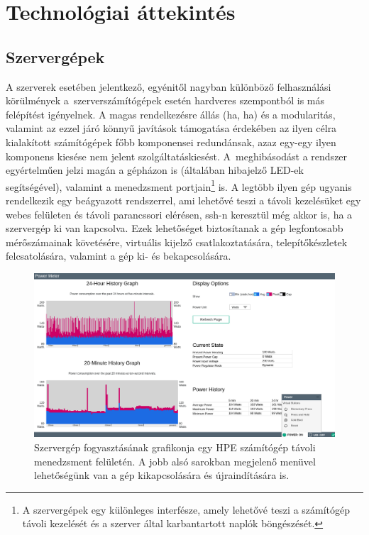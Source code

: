 
\chapter{Technológiai áttekintés}
\label{chap:technologies}

\section{Szervergépek}
\label{sect:servers}
A szerverek esetében jelentkező, egyénitől nagyban különböző felhasználási körülmények a~szerverszámítógépek esetén hardveres szempontból is más felépítést igényelnek. A magas rendelkezésre állás (\acrlong{ha}, \acrshort{ha}) és a modularitás, valamint az ezzel járó könnyű javítások támogatása érdekében az ilyen célra kialakított számítógépek főbb komponensei redundánsak, azaz egy-egy ilyen komponens kiesése nem jelent szolgáltatáskiesést. A~meghibásodást a rendszer egyértelműen jelzi magán a gépházon is (általában hibajelző LED-ek segítségével), valamint a menedzsment portjain\footnote{A szervergépek egy különleges interfésze, amely lehetővé teszi a számítógép távoli kezelését és a szerver által karbantartott naplók böngészését.} is. A legtöbb ilyen gép ugyanis rendelkezik egy beágyazott rendszerrel, ami lehetővé teszi a távoli kezelésüket egy webes felületen és távoli parancssori elérésen, \acrshort{ssh}-n keresztül még akkor is, ha a szervergép ki van kapcsolva. Ezek lehetőséget biztosítanak a gép legfontosabb mérőszámainak követésére, virtuális kijelző csatlakoztatására, telepítőkészletek felcsatolására, valamint a gép ki- és bekapcsolására.

\begin{figure}[!ht]
	\centering
	\includegraphics[width=150mm, keepaspectratio]{figures/ilo-power1.png}
	\caption{Szervergép fogyasztásának grafikonja egy HPE számítógép távoli menedzsment felületén. A jobb alsó sarokban megjelenő menüvel lehetőségünk van a gép kikapcsolására és újraindítására is.}
	\label{fig:ilopowerchart}
\end{figure}

